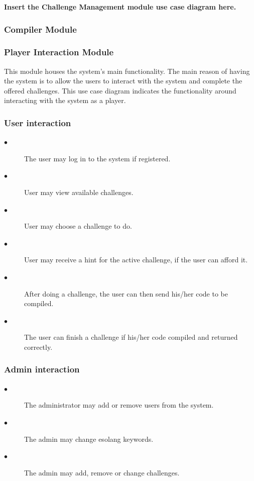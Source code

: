 \documentclass[english]{article}
\begin{document}
\textbf{Insert the Challenge Management module use case diagram here.} \newline
		\subsubsection{Compiler Module}
		\subsubsection{Player Interaction Module}
		This module houses the system's main functionality. The main reason of having the system is to allow the users to interact with the system and complete the offered challenges. This use case diagram indicates the functionality around interacting with the system as a player.
		
	\iffalse	
		\subsubsection{User interaction}
		\begin{description}
			\item[$\bullet$] The user may log in to the system if registered.
			\item[$\bullet$] User may view available challenges.
			\item[$\bullet$] User may choose a challenge to do.
			\item[$\bullet$] User may receive a hint for the active challenge, if the user can afford it.
			\item[$\bullet$] After doing a challenge, the user can then send his/her code to be compiled.
			\item[$\bullet$] The user can finish a challenge if his/her code compiled and returned correctly.
		\end{description}
		
		\subsubsection{Admin interaction}
		\begin{description}
			\item[$\bullet$] The administrator may add or remove users from the system.
			\item[$\bullet$] The admin may change esolang keywords.
			\item[$\bullet$] The admin may add, remove or change challenges.
		\end{description}
\end{document}

